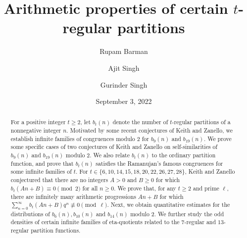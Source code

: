 \documentclass[reqno]{amsart}
\theoremstyle{definition}
\theoremstyle{remark}
\numberwithin{equation}{section}
\begin{document}
\title[Arithmetic properties of certain $t$-regular partitions]{Arithmetic properties of certain $t$-regular partitions}
	
\author{Rupam Barman}
\address{Department of Mathematics, Indian Institute of Technology Guwahati, Assam, India, PIN- 781039}
	
\author{Ajit Singh}
\address{Department of Mathematics, Indian Institute of Technology Guwahati, Assam, India, PIN- 781039}
	
\author{Gurinder Singh}
\address{Department of Mathematics, Indian Institute of Technology Guwahati, Assam, India, PIN- 781039}
	
\date{September 3, 2022}




\dedicatory{}

\begin{abstract} For a positive integer $t\geq 2$, let $b_{t}(n)$ denote the number of $t$-regular partitions of a nonnegative integer $n$. 
Motivated by some recent conjectures of Keith and Zanello, we establish infinite families of congruences modulo $2$ for $b_9(n)$ and $b_{19}(n)$. 
We prove some specific cases of two conjectures of Keith and Zanello on self-similarities of $b_9(n)$ and $b_{19}(n)$ modulo $2$. 
We also relate $b_{t}(n)$ to the ordinary partition function, and prove that $b_{t}(n)$ satisfies the Ramanujan's famous congruences for some infinite families of $t$. 
For $t\in \{6,10,14,15,18,20,22,26,27,28\}$, Keith and Zanello conjectured that there are no integers $A>0$ and $B\geq 0$ for which $b_t(An+ B)\equiv 0\pmod 2$ for all $n\geq 0$. 
We prove that, for any $t\geq 2$ and prime $\ell$, there are infinitely many arithmetic progressions $An+B$ for which $\sum_{n=0}^{\infty}b_t(An+B)q^n\not\equiv0 \pmod{\ell}$. 
Next, we obtain quantitative estimates for the distributions of $b_{6}(n), b_{10}(n)$ and $b_{14}(n)$ modulo 2. 
We further study the odd densities of certain infinite families of eta-quotients related to the 7-regular and $13$-regular partition functions.
\end{abstract}
\end{document}
